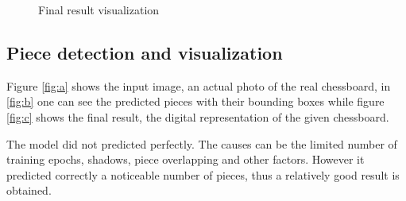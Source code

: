 \documentclass[conference]{IEEEtran}
\begin{document}
\begin{figure}[!tbp]
  \centering
  \hfill
  \hfill
  \caption{Final result visualization}
\end{figure}

\subsection{Piece detection and visualization}

Figure \ref{fig:a} shows the input image, an actual photo of the real chessboard, in \ref{fig:b} one can see the predicted pieces with their bounding boxes while figure \ref{fig:c} shows the final result, the digital representation of the given chessboard.

The model did not predicted perfectly. The causes can be the limited number of training epochs, shadows, piece overlapping and other factors. However it predicted correctly a noticeable number of pieces, thus a relatively good result is obtained.
\end{document}

